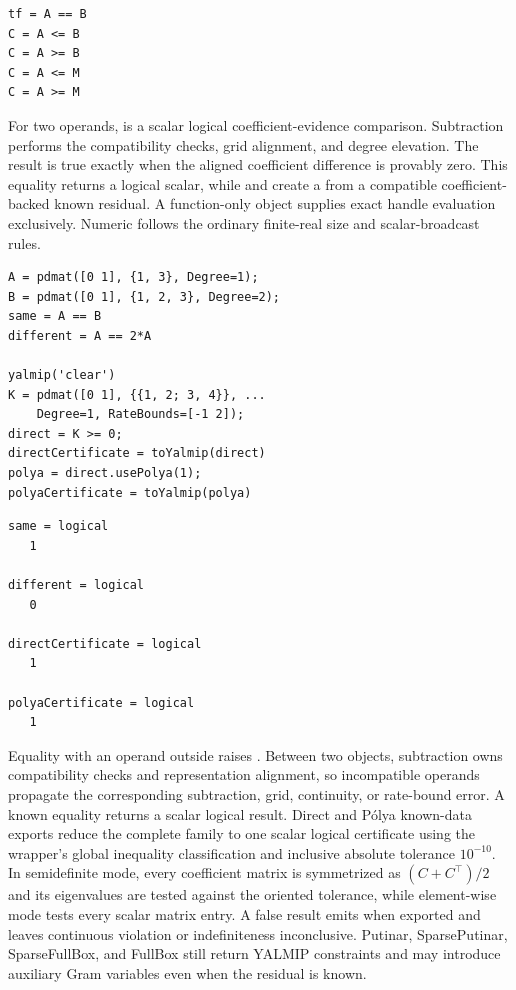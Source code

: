 \syntaxhead
\begin{lstlisting}[style=dpsyntax]
tf = A == B
C = A <= B
C = A >= B
C = A <= M
C = A >= M
\end{lstlisting}

\arghead For two  operands,  is a scalar logical coefficient-evidence comparison. Subtraction performs the compatibility checks, grid alignment, and degree elevation. The result is true exactly when the aligned coefficient difference is provably zero. This equality returns a logical scalar, while \code{<=} and \code{>=} create a  from a compatible coefficient-backed known residual. A function-only object supplies exact handle evaluation exclusively. Numeric  follows the ordinary finite-real size and scalar-broadcast rules.

\examplehead
\begin{lstlisting}[style=dpmatlab]
A = pdmat([0 1], {1, 3}, Degree=1);
B = pdmat([0 1], {1, 2, 3}, Degree=2);
same = A == B
different = A == 2*A

yalmip('clear')
K = pdmat([0 1], {{1, 2; 3, 4}}, ...
    Degree=1, RateBounds=[-1 2]);
direct = K >= 0;
directCertificate = toYalmip(direct)
polya = direct.usePolya(1);
polyaCertificate = toYalmip(polya)
\end{lstlisting}

\begin{lstlisting}[style=dpoutput]
same = logical
   1

different = logical
   0

directCertificate = logical
   1

polyaCertificate = logical
   1
\end{lstlisting}

\remarkshead
Equality with an operand outside  raises . Between two  objects, subtraction owns compatibility checks and representation alignment, so incompatible operands propagate the corresponding subtraction, grid, continuity, or rate-bound error. A known  equality returns a scalar logical result. Direct and P\'olya known-data exports reduce the complete family to one scalar logical certificate using the wrapper's global inequality classification and inclusive absolute tolerance $10^{-10}$. In semidefinite mode, every coefficient matrix is symmetrized as $(C+C^\top)/2$ and its eigenvalues are tested against the oriented tolerance, while element-wise mode tests every scalar matrix entry. A false result emits  when exported and leaves continuous violation or indefiniteness inconclusive. Putinar, SparsePutinar, SparseFullBox, and FullBox still return YALMIP constraints and may introduce auxiliary Gram variables even when the residual is known.

